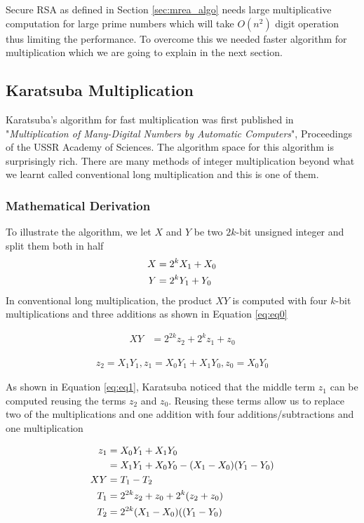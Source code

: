\documentclass[conference]{IEEEtran}
\begin{document}
Secure RSA as defined in Section \ref{sec:mrea_algo} needs large multiplicative computation for large prime numbers which will take $O(n^2)$ digit operation thus limiting the performance. To overcome this we needed faster algorithm for multiplication which we are going to explain in the next section.

\subsection{{\large Karatsuba Multiplication}}
\label{sec: karatsuba_code}
Karatsuba's algorithm for fast multiplication was first published in "\emph{Multiplication of Many-Digital Numbers by Automatic Computers}"\cite{karatsuba}, Proceedings of the USSR Academy of Sciences. The algorithm space for this algorithm is surprisingly rich. There are many methods of integer multiplication beyond what we learnt called conventional long multiplication and this is one of them. 

\subsubsection{\bf Mathematical Derivation}

To illustrate the algorithm, we let $X$ and $Y$ be two $2k$-bit unsigned integer and split them both in half
\begin{align}
X &= 2^{k}X_{1} + X_{0} \notag \\
Y &= 2^{k}Y_{1} + Y_{0} 
\end{align}
In conventional long multiplication, the product $XY$ is computed with four $k$-bit multiplications and three additions as shown in Equation \ref{eq:eq0}

\begin{align}
\label{eq:eq0}
XY &= 2^{2k}z_{2} + 2^{k}z_{1} + z_{0}
\end{align}

\begin{align}
\label{eq:eq1}
z_2 = X_{1}Y_{1}, z_{1} = X_{0}Y_{1} + X_{1}Y_{0}, z_{0} = X_{0}Y_{0}
\end{align}

As shown in Equation \ref{eq:eq1}, Karatsuba\cite{karatsuba} noticed that the middle term $z_1$ can be computed reusing the terms $z_2$ and $z_0$. Reusing these terms allow us to  replace two of the multiplications and one addition with four additions/subtractions and one multiplication

\begin{align}
z_{1} &=  X_{0}Y_{1} + X_{1}Y_{0} \notag\\
&=  X_{1}Y_{1} + X_{0}Y_{0} - (X_{1} - X_{0})(Y_{1} - Y_{0}) \notag\\
XY &= T_{1} - T_{2} \notag \\
T_{1} &= 2^{2k}z_{2} + z_{0} + 2^{k}(z_{2} + z_{0}) \notag \\
T_{2} &= 2^{2k}(X_{1} - X_{0})((Y_{1}-Y_{0})
\label{eq:eq2}
\end{align}
\end{document}

